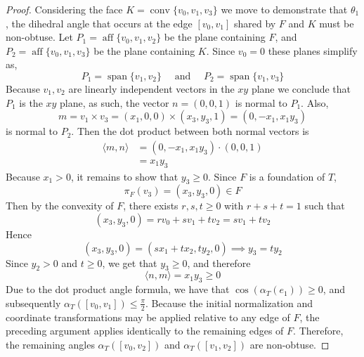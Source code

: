 \documentclass{mainresearch}
\begin{document}
\begin{proof}
	Considering the face $K = \operatorname{conv}\{v_0,v_1,v_3\}$ we move to demonstrate that $\theta_1$, the dihedral angle that occurs at the edge $[v_0,v_1]$ shared by $F$ and $K$ must be non-obtuse. Let $P_1 = \operatorname{aff}\{v_0,v_1,v_2\}$ be the plane containing $F$, and $P_2 = \operatorname{aff}\{v_0,v_1,v_3\}$ be the plane containing $K$. Since $v_0=0$ these planes simplify as,
	\[
	P_1= \operatorname{span} \{v_1,v_2\} \quad \text{ and } \quad P_2= \operatorname{span} \{v_1,v_3\}
	\]
	Because $v_1,v_2$ are linearly independent vectors in the $xy$ plane we conclude that $P_1$ is the $xy$ plane, as such, the vector $n=(0,0,1)$ is normal to $P_1$. Also, 
	\begin{equation*}
		m = v_1\times v_3 = (x_1,0,0) \times (x_3,y_3,1) = (0,-x_1,x_1y_3)
	\end{equation*}
	is normal to $P_2$. Then the dot product between both normal vectors is 
	\begin{align*}
		\langle m , n \rangle  &= (0,-x_1,x_1y_3) \cdot (0,0,1) \\
		&= x_1y_3
	\end{align*}
	Because $x_1>0$, it remains to show that $y_3 \ge 0$. Since $F$ is a foundation of $T$,
	\begin{equation*}
		\pi_F(v_3)= (x_3,y_3,0) \in F
	\end{equation*}
	Then by the convexity of $F$, there exists $r,s,t \ge 0$ with $r+s+t = 1$ such that
	\begin{equation*}
		(x_3,y_3,0) = rv_0+sv_1+tv_2 = sv_1+tv_2
	\end{equation*}
	Hence 
	\begin{equation*}
		(x_3,y_3,0) = (sx_1+tx_2,ty_2,0) \implies y_3 =ty_2
	\end{equation*}
	Since $y_2 >0$ and $t\ge 0$, we get that $y_3 \ge 0$, and therefore
	\begin{equation*}
		\langle n , m \rangle = x_1y_3 \ge 0 
	\end{equation*}
	Due to the dot product angle formula, we have that $\cos(\alpha_T(e_1)) \ge 0 $, and subsequently $\alpha_T([v_0,v_1]) \le \frac{\pi}{2}$. Because the initial normalization and coordinate transformations may be applied relative to any edge of $F$, the preceding argument applies identically to the remaining edges of $F$. Therefore, the remaining angles $\alpha_T([v_0,v_2])$ and $ \alpha_T([v_1,v_2])$ are non-obtuse.
	
	
	
	
	

\end{proof}
\end{document}
